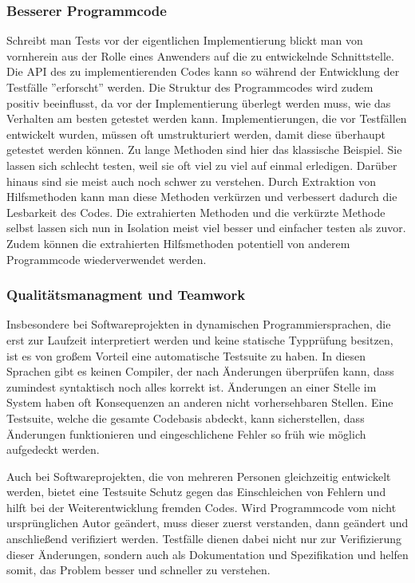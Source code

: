 \subsubsection{Besserer Programmcode}
Schreibt man Tests vor der eigentlichen Implementierung blickt man von
vornherein aus der Rolle eines Anwenders auf die zu entwickelnde
Schnittstelle. Die API des zu implementierenden Codes kann so während
der Entwicklung der Testfälle ''erforscht'' werden. Die Struktur des
Programmcodes wird zudem positiv beeinflusst, da vor der
Implementierung überlegt werden muss, wie das Verhalten am besten
getestet werden kann. Implementierungen, die vor Testfällen entwickelt
wurden, müssen oft umstrukturiert werden, damit diese überhaupt
getestet werden können. Zu lange Methoden sind hier das klassische
Beispiel. Sie lassen sich schlecht testen, weil sie oft viel zu viel
auf einmal erledigen. Darüber hinaus sind sie meist auch noch schwer
zu verstehen. Durch Extraktion von Hilfsmethoden kann man diese
Methoden verkürzen und verbessert dadurch die Lesbarkeit des
Codes. Die extrahierten Methoden und die verkürzte Methode selbst
lassen sich nun in Isolation meist viel besser und einfacher testen
als zuvor. Zudem können die extrahierten Hilfsmethoden potentiell von
anderem Programmcode wiederverwendet werden.

\subsubsection{Qualitätsmanagment und Teamwork}
Insbesondere bei Softwareprojekten in dynamischen Programmiersprachen,
die erst zur Laufzeit interpretiert werden und keine statische
Typprüfung besitzen, ist es von großem Vorteil eine automatische
Testsuite zu haben. In diesen Sprachen gibt es keinen Compiler, der
nach Änderungen überprüfen kann, dass zumindest syntaktisch noch alles
korrekt ist. Änderungen an einer Stelle im System haben oft
Konsequenzen an anderen nicht vorhersehbaren Stellen. Eine Testsuite,
welche die gesamte Codebasis abdeckt, kann sicherstellen, dass
Änderungen funktionieren und eingeschlichene Fehler so früh wie
möglich aufgedeckt werden.

Auch bei Softwareprojekten, die von mehreren Personen gleichzeitig
entwickelt werden, bietet eine Testsuite Schutz gegen das
Einschleichen von Fehlern und hilft bei der Weiterentwicklung fremden
Codes. Wird Programmcode vom nicht ursprünglichen Autor geändert, muss
dieser zuerst verstanden, dann geändert und anschließend verifiziert
werden. Testfälle dienen dabei nicht nur zur Verifizierung dieser
Änderungen, sondern auch als Dokumentation und Spezifikation und
helfen somit, das Problem besser und schneller zu verstehen.

